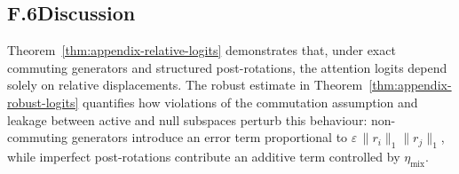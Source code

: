 \documentclass[11pt]{article}
\begin{document}
\subsection*{F.6\quad Discussion}

Theorem~\ref{thm:appendix-relative-logits} demonstrates that, under exact commuting generators and
structured post-rotations, the attention logits depend solely on relative displacements.  The robust
estimate in Theorem~\ref{thm:appendix-robust-logits} quantifies how violations of the commutation
assumption and leakage between active and null subspaces perturb this behaviour: non-commuting
generators introduce an error term proportional to $\varepsilon\,\|r_i\|_1\|r_j\|_1$, while imperfect
post-rotations contribute an additive term controlled by $\eta_{\mathrm{mix}}$.
\end{document}
